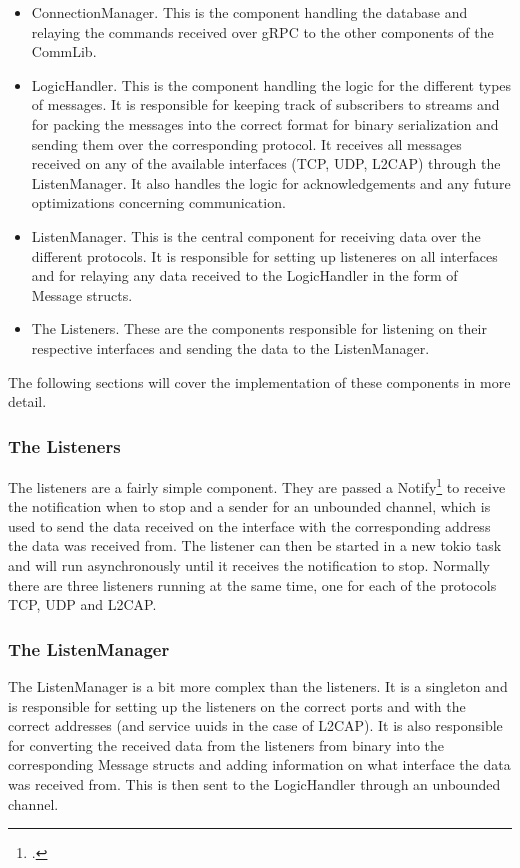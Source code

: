 \begin{itemize}
  \item ConnectionManager. This is the component handling the database and relaying the commands received over gRPC to the other components of the CommLib.
  \item LogicHandler. This is the component handling the logic for the different types of messages. It is responsible for keeping track of subscribers to streams
  and for packing the messages into the correct format for binary serialization and sending them over the corresponding protocol. It receives all messages received on
  any of the available interfaces (TCP, UDP, L2CAP) through the ListenManager. It also handles the logic for 
  acknowledgements and any future optimizations concerning communication.
  \item ListenManager. This is the central component for receiving data over the different protocols. It is responsible for setting up listeneres on all interfaces and
  for relaying any data received to the LogicHandler in the form of Message structs.
  \item The Listeners. These are the components responsible for listening on their respective interfaces and sending the data to the ListenManager. 
\end{itemize}

The following sections will cover the implementation of these components in more detail.

\subsubsection{The Listeners}
The listeners are a fairly simple component. They are passed a Notify\footcite{rust-notify} to receive the notification when to stop and a sender for an unbounded channel, 
which is used to send the data received on the interface with the corresponding address the data was received from. 
The listener can then be started in a new tokio task and will run asynchronously until it receives the notification to stop.
Normally there are three listeners running at the same time, one for each of the protocols TCP, UDP and L2CAP.

\subsubsection{The ListenManager}
The ListenManager is a bit more complex than the listeners. It is a singleton and is responsible for setting up the listeners on the correct ports and with the correct addresses
(and service uuids in the case of L2CAP). It is also responsible for converting the received data from the listeners from binary into the corresponding Message structs and adding
information on what interface the data was received from. This is then sent to the LogicHandler through an unbounded channel.

